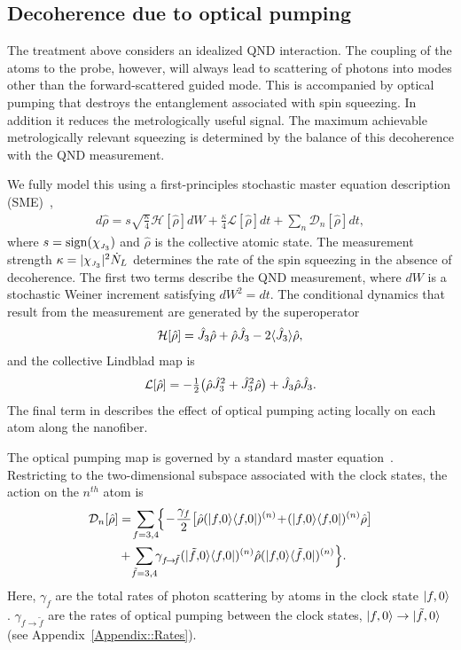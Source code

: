 \documentclass[aps,pra,twocolumn]{revtex4-1} %
\newcommand{\jz}{\hat{J}_3}
\newcommand{\chieff}{\chi_{\raisebox{-.1pt}{\tiny $J_3$}}}
\newcommand{\comment}[1]{{\color{Maroon} #1}}
\begin{document}
	\subsection{Decoherence due to optical pumping}\label{sec:decoherence}
	
The treatment above considers an idealized QND interaction. 
The coupling of the atoms to the probe, however, will always lead to scattering of photons into modes other than the forward-scattered guided mode.  
This is accompanied by optical pumping that destroys the entanglement associated with spin squeezing.  In addition it reduces the metrologically useful signal.  
The maximum achievable metrologically relevant squeezing is determined by the balance of this decoherence with the QND measurement. 

We fully model this using a first-principles stochastic master equation description (SME)~\cite{jacobs_straightforward_2006, baragiola_three-dimensional_2014},
	\begin{align} \label{Eq::SME}
		d \hat{\rho} = s\sqrt{\frac{\kappa}{4}} \mathcal{H}[\hat{\rho}] dW + \frac{\kappa}{4} \mathcal{L}[\hat{\rho}] dt + \sum_n \mathcal{D}_n [\hat{\rho}] dt,
	\end{align}
where $s = {\rm sign}(\chieff)$ and $\hat{\rho}$ is the collective atomic state. 
The measurement strength $\kappa =|\chieff|^2 \dot{N}_L$ determines the rate of the spin squeezing in the absence of decoherence.  
The first two terms describe the QND measurement, where $dW$ is a stochastic Weiner increment satisfying $dW^2 = dt$. 
The conditional dynamics that result from the measurement are generated by the superoperator
	\begin{align}
		\mathcal{H}[\hat{\rho}] = \jz \hat{\rho} + \hat{\rho} \jz - 2 \expt{\jz} \hat{\rho},
	\end{align}
and the collective Lindblad map is
	\begin{align}
		\mathcal{L}[\hat{\rho}] = - \smallfrac{1}{2} \big( \hat{\rho}  \jz^2 + \jz^2 \hat{\rho} \big) + \jz \hat{\rho} \jz.
	\end{align}
The final term in  describes the effect of optical pumping acting locally on each atom along the nanofiber. 

The optical pumping map is governed by a standard master equation~\cite{deutsch_quantum_2010}.  
Restricting to the two-dimensional subspace associated with the clock states, the action on the $n^{th}$ atom is
	\begin{align}
		\mathcal{D}_n[\hat{\rho}] &=  \!\sum_{f=3,4}\!\! \Big\{ \!-\! \frac{\gamma_{f}}{2} \big[ \hat{\rho} (\op{f,\! 0}{f,\! 0})^{(n)} \!+\! (\op{f,\! 0}{f,\! 0})^{(n)}\hat{\rho} \big]\nn\\
		&+\!  \sum_{\tilde{f} =3,4}\!\!  \gamma_{f \!\rightarrow\! \tilde{f}}(\op{\tilde{f},\! 0}{f,\! 0})^{(n)} \hat{\rho}(\op{f,\! 0}{\tilde{f},\! 0})^{(n)} \Big\}.
	\end{align}
Here, \comment{$\gamma_{f}$ are the total rates of photon scattering by atoms in the clock state $\lvert{f,0}\rangle$.  $\gamma_{f \rightarrow \tilde{f} }$ are the rates of optical pumping between the clock states, $\lvert{f,0}\rangle \rightarrow \lvert{\tilde{f},0}\rangle$ (see Appendix~\ref{Appendix::Rates}). } 
\end{document}
